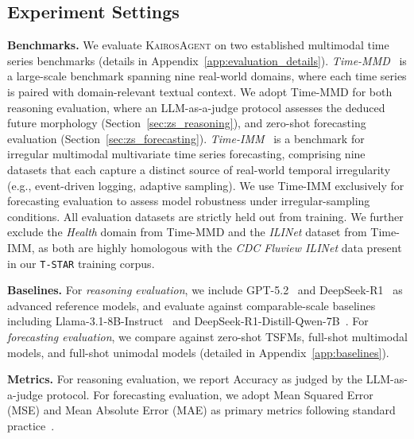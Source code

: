 \documentclass[11pt]{article}
\newcommand{\method}{\textsc{KairosAgent}\xspace}
\newcommand{\minisection}[1]{\vspace{5pt}\noindent\textbf{#1.}}
\begin{document}
\subsection{Experiment Settings}
\minisection{Benchmarks}
We evaluate \method on two established multimodal time series benchmarks (details in Appendix~\ref{app:evaluation_details}).
\textit{Time-MMD}~\citep{liu2024time} is a large-scale benchmark spanning nine real-world domains, where each time series is paired with domain-relevant textual context.
We adopt Time-MMD for both reasoning evaluation, where an LLM-as-a-judge protocol assesses the deduced future morphology (Section~\ref{sec:zs_reasoning}), and zero-shot forecasting evaluation (Section~\ref{sec:zs_forecasting}).
\textit{Time-IMM}~\citep{chang2026time} is a benchmark for irregular multimodal multivariate time series forecasting, comprising nine datasets that each capture a distinct source of real-world temporal irregularity (e.g., event-driven logging, adaptive sampling).
We use Time-IMM exclusively for forecasting evaluation to assess model robustness under irregular-sampling conditions.
All evaluation datasets are strictly held out from training.
We further exclude the \textit{Health} domain from Time-MMD and the \textit{ILINet} dataset from Time-IMM, as both are highly homologous with the \textit{CDC Fluview ILINet} data present in our \texttt{T-STAR} training corpus.

\minisection{Baselines}
For \textit{reasoning evaluation}, we include GPT-5.2~\citep{singh2025openai} and DeepSeek-R1~\citep{guo2025deepseek} as advanced reference models, and evaluate against comparable-scale baselines including Llama-3.1-8B-Instruct~\citep{grattafiori2024llama} and DeepSeek-R1-Distill-Qwen-7B~\citep{guo2025deepseek}.
For \textit{forecasting evaluation}, we compare against zero-shot TSFMs, full-shot multimodal models, and full-shot unimodal models (detailed in Appendix~\ref{app:baselines}).

\minisection{Metrics}
For reasoning evaluation, we report Accuracy as judged by the LLM-as-a-judge protocol.
For forecasting evaluation, we adopt Mean Squared Error (MSE) and Mean Absolute Error (MAE) as primary metrics following standard practice~\citep{liu2024time, chang2026time}.
\end{document}
